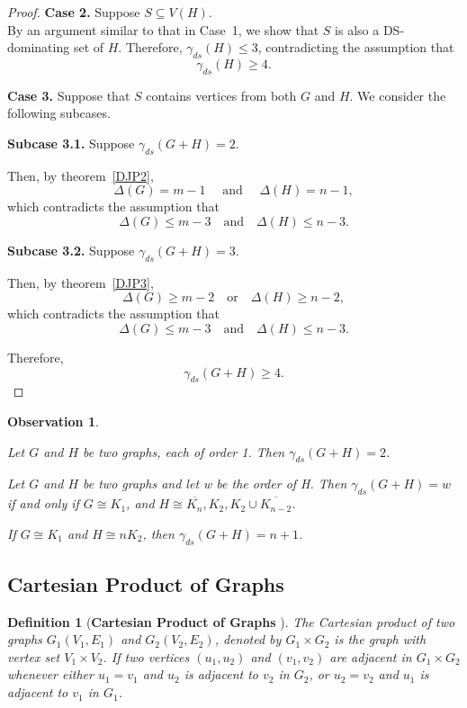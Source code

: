 \documentclass{article}
\newtheorem{observation}{Observation}[section]
\newtheorem{definition}{Definition}[section]
\begin{document}
\begin{proof}
\textbf{Case 2.} Suppose $S\subseteq V(H)$.\\
By an argument similar to that in Case~1,  we show that $S$ is also a DS-dominating set of $H$.
Therefore, $
\gamma_{ds}(H)\le3$,
contradicting the assumption that
\[
\gamma_{ds}(H)\ge4.
\]

\textbf{Case 3.} Suppose that $S$ contains vertices from both $G$ and $H$.
We consider the following subcases.

\textbf{Subcase 3.1.} Suppose $\gamma_{ds}(G+H)=2$.

Then, by theorem~\ref{DJP2},
\[
\Delta(G)=m-1
\quad \text{ and } \quad
\Delta(H)=n-1,
\]
which contradicts the assumption that
\[
\Delta(G)\le m-3
\quad \text{and} \quad
\Delta(H)\le n-3.
\]

\textbf{Subcase 3.2.} Suppose $\gamma_{ds}(G+H)=3$.

Then, by  theorem~\ref{DJP3},
\[
\Delta(G)\ge m-2
\quad \text{or} \quad
\Delta(H)\ge n-2,
\]
which contradicts the assumption that
\[
\Delta(G)\le m-3
\quad \text{and} \quad
\Delta(H)\le n-3.
\]

Therefore,
\[
\gamma_{ds}(G+H)\ge4.
\]
\end{proof}

\begin{observation}
\leavevmode
\begin{enumerate}
\item{Let $G$ and $H$ be two graphs, each of order 1. Then $\gamma_{ds}(G+H)= 2$.}
\item{Let $G$ and $H$ be two graphs and let w be the order of H. Then $\gamma_{ds}(G+H)= w$ if and only if $G \cong K_1$, and $H \cong \overline{K_n},  K_2,  K_2 \cup \overline{K_{n-2}}$.
\item{If $G \cong K_{1}$ and $H \cong nK_{2}$, then $\gamma_{ds}(G+H)=n+1$.}}
\end{enumerate}
\end{observation}
\subsection{Cartesian Product of Graphs}
\begin{definition}[\textbf{Cartesian Product of Graphs} {\cite{West}}]
The Cartesian product of two graphs $G_1(V_1,E_1)$ and $G_2(V_2,E_2)$, denoted by
$G_1 \times G_2$ is the graph with vertex set $V_1 \times V_2$.
If two vertices $(u_1,u_2)$ and $(v_1,v_2)$ are adjacent in $G_1 \times G_2$
whenever either $u_1 = v_1$ and $u_2$ is adjacent to $v_2$ in $G_2$, or
$u_2 = v_2$ and $u_1$ is adjacent to $v_1$ in $G_1$.
\end{definition}
\end{document}
